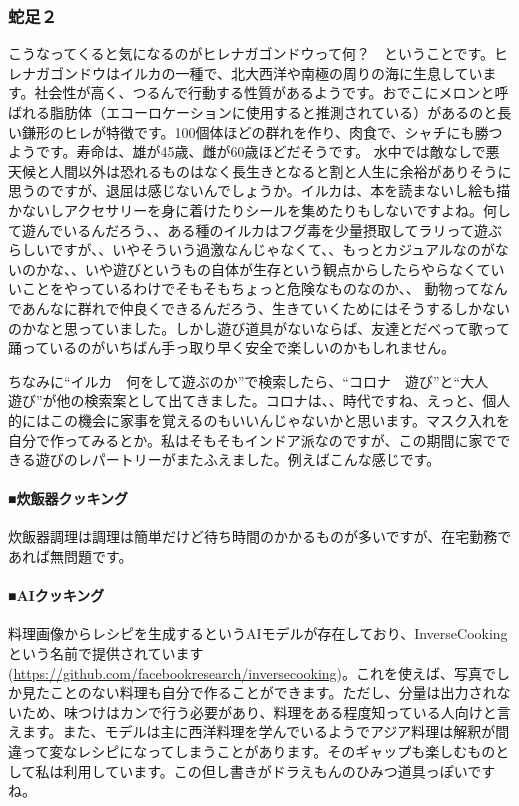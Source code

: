 \documentclass[dvipdfmx,autodetect-engine,10pt,b5paper,papersize,openany,dvipsnames]{jsbook}
\begin{document}
\begin{multicols}{2}
\subsubsection*{蛇足２}
こうなってくると気になるのがヒレナガゴンドウって何？　ということです。ヒレナガゴンドウはイルカの一種で、北大西洋や南極の周りの海に生息しています。社会性が高く、つるんで行動する性質があるようです。おでこにメロンと呼ばれる脂肪体（エコーロケーションに使用すると推測されている）があるのと長い鎌形のヒレが特徴です。100個体ほどの群れを作り、肉食で、シャチにも勝つようです。寿命は、雄が45歳、雌が60歳ほどだそうです。
水中では敵なしで悪天候と人間以外は恐れるものはなく長生きとなると割と人生に余裕がありそうに思うのですが、退屈は感じないんでしょうか。イルカは、本を読まないし絵も描かないしアクセサリーを身に着けたりシールを集めたりもしないですよね。何して遊んでいるんだろう、、ある種のイルカはフグ毒を少量摂取してラリって遊ぶらしいですが、、いやそういう過激なんじゃなくて、、もっとカジュアルなのがないのかな、、いや遊びというもの自体が生存という観点からしたらやらなくていいことをやっているわけでそもそもちょっと危険なものなのか、、
動物ってなんであんなに群れで仲良くできるんだろう、生きていくためにはそうするしかないのかなと思っていました。しかし遊び道具がないならば、友達とだべって歌って踊っているのがいちばん手っ取り早く安全で楽しいのかもしれません。
 

ちなみに“イルカ　何をして遊ぶのか”で検索したら、“コロナ　遊び”と“大人　遊び”が他の検索案として出てきました。コロナは、、時代ですね、えっと、個人的にはこの機会に家事を覚えるのもいいんじゃないかと思います。マスク入れを自分で作ってみるとか。私はそもそもインドア派なのですが、この期間に家でできる遊びのレパートリーがまたふえました。例えばこんな感じです。

\paragraph{\gtfamily\bfseries ■炊飯器クッキング}
炊飯器調理は調理は簡単だけど待ち時間のかかるものが多いですが、在宅勤務であれば無問題です。

\paragraph{\gtfamily\bfseries ■AIクッキング}
料理画像からレシピを生成するというAIモデルが存在しており、InverseCookingという名前で提供されています (\url{https://github.com/facebookresearch/inversecooking})。これを使えば、写真でしか見たことのない料理も自分で作ることができます。ただし、分量は出力されないため、味つけはカンで行う必要があり、料理をある程度知っている人向けと言えます。また、モデルは主に西洋料理を学んでいるようでアジア料理は解釈が間違って変なレシピになってしまうことがあります。そのギャップも楽しむものとして私は利用しています。この但し書きがドラえもんのひみつ道具っぽいですね。
 

\end{multicols}
\end{document}
